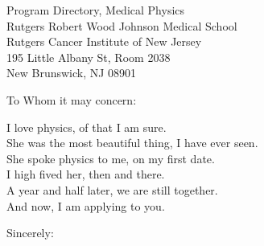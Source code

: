 \documentclass[
    jphafner,
    subject=left, %
    title=centering,
    backaddress=false,
]{scrlttr2}
\date{\today}
\begin{document}
\begin{letter}{%
Program Directory, Medical Physics \\
Rutgers Robert Wood Johnson Medical School \\
Rutgers Cancer Institute of New Jersey \\
195 Little Albany St, Room 2038 \\
New Brunswick, NJ 08901 \\
}
\opening{To Whom it may concern:}

I love physics, of that I am sure. \\
She was the most beautiful thing, I have ever seen. \\
She spoke physics to me, on my first date. \\
I high fived her, then and there. \\
A year and half later, we are still together. \\
And now, I am applying to you.


\closing{Sincerely:}

\end{letter}
\end{document}
